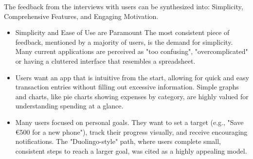 \documentclass[a4paper,12pt]{article}
\begin{document}
The feedback from the interviews with users can be synthesized into: Simplicity, Comprehensive Features, and Engaging Motivation.
\begin{itemize}
\item Simplicity and Ease of Use are Paramount
The most consistent piece of feedback, mentioned by a majority of users, is the demand for simplicity. Many current applications are perceived as "too confusing", "overcomplicated" or having a cluttered interface that resembles a spreadsheet.

\item Users want an app that is intuitive from the start, allowing for quick and easy transaction entries without filling out excessive information.
Simple graphs and charts, like pie charts showing expenses by category, are highly valued for understanding spending at a glance.
\item Many users focused on personal goals. They want to set a target (e.g., "Save €500 for a new phone"), track their progress visually, and receive encouraging notifications. The "Duolingo-style" path, where users complete small, consistent steps to reach a larger goal, was cited as a highly appealing model.
\end{itemize}
\end{document}

